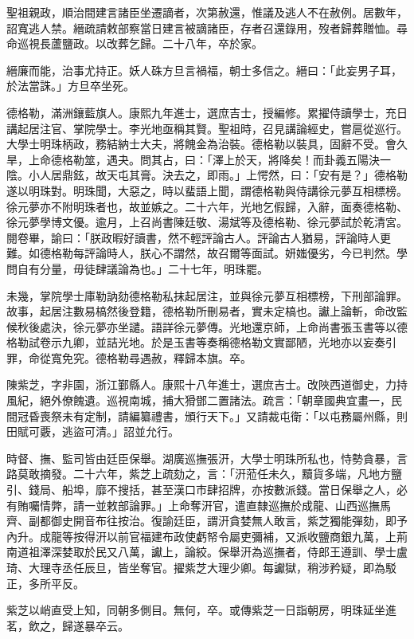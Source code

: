 \begin{pinyinscope}
聖祖親政，順治間建言諸臣坐遷謫者，次第赦還，惟議及逃人不在赦例。居數年，詔寬逃人禁。縉疏請敕部察當日建言被謫諸臣，存者召還錄用，歿者歸葬贈恤。尋命巡視長蘆鹽政。以改葬乞歸。二十八年，卒於家。

縉廉而能，治事尤持正。妖人硃方旦言禍福，朝士多信之。縉曰：「此妄男子耳，於法當誅。」方旦卒坐死。

德格勒，滿洲鑲藍旗人。康熙九年進士，選庶吉士，授編修。累擢侍讀學士，充日講起居注官、掌院學士。李光地亟稱其賢。聖祖時，召見講論經史，嘗扈從巡行。大學士明珠柄政，務結納士大夫，將餽金為治裝。德格勒以裝具，固辭不受。會久旱，上命德格勒筮，遇夬。問其占，曰：「澤上於天，將降矣！而卦義五陽決一陰。小人居鼎鉉，故天屯其膏。決去之，即雨。」上愕然，曰：「安有是？」德格勒遂以明珠對。明珠聞，大惡之，時以蜚語上聞，謂德格勒與侍講徐元夢互相標榜。徐元夢亦不附明珠者也，故並嫉之。二十六年，光地乞假歸，入辭，面奏德格勒、徐元夢學博文優。逾月，上召尚書陳廷敬、湯斌等及德格勒、徐元夢試於乾清宮。閱卷畢，諭曰：「朕政暇好讀書，然不輕評論古人。評論古人猶易，評論時人更難。如德格勒每評論時人，朕心不謂然，故召爾等面試。妍媸優劣，今已判然。學問自有分量，毋徒肆議論為也。」二十七年，明珠罷。

未幾，掌院學士庫勒訥劾德格勒私抹起居注，並與徐元夢互相標榜，下刑部論罪。故事，起居注數易槁然後登籍，德格勒所刪易者，實未定槁也。讞上論斬，命改監候秋後處決，徐元夢亦坐譴。語詳徐元夢傳。光地還京師，上命尚書張玉書等以德格勒試卷示九卿，並詰光地。於是玉書等奏稱德格勒文實鄙陋，光地亦以妄奏引罪，命從寬免究。德格勒尋遇赦，釋歸本旗。卒。

陳紫芝，字非園，浙江鄞縣人。康熙十八年進士，選庶吉士。改陜西道御史，力持風紀，絕外僚餽遺。巡視南城，捕大猾鄧二置諸法。疏言：「朝章國典宜畫一，民間冠昏喪祭未有定制，請編纂禮書，頒行天下。」又請裁屯衛：「以屯務屬州縣，則田賦可覈，逃盜可清。」詔並允行。

時督、撫、監司皆由廷臣保舉。湖廣巡撫張汧，大學士明珠所私也，恃勢貪暴，言路莫敢摘發。二十六年，紫芝上疏劾之，言：「汧蒞任未久，黷貨多端，凡地方鹽引、錢局、船埠，靡不搜括，甚至漢口市肆招牌，亦按數派錢。當日保舉之人，必有賄囑情弊，請一並敕部論罪。」上命奪汧官，遣直隸巡撫於成龍、山西巡撫馬齊、副都御史開音布往按治。復諭廷臣，謂汧貪婪無人敢言，紫芝獨能彈劾，即予內升。成龍等按得汧以前官福建布政使虧帑令屬吏彌補，又派收鹽商銀九萬，上荊南道祖澤深婪取於民又八萬，讞上，論絞。保舉汧為巡撫者，侍郎王遵訓、學士盧琦、大理寺丞任辰旦，皆坐奪官。擢紫芝大理少卿。每讞獄，稍涉矜疑，即為駁正，多所平反。

紫芝以峭直受上知，同朝多側目。無何，卒。或傳紫芝一日詣朝房，明珠延坐進茗，飲之，歸遂暴卒云。


\end{pinyinscope}

